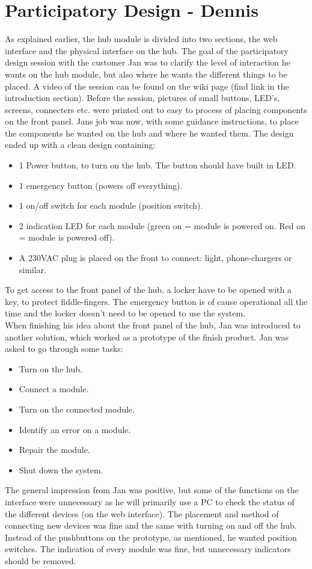 \section{Participatory Design - Dennis}
As explained earlier, the hub module is divided into two sections, the web interface and the physical interface on the hub. 
The goal of the participatory design session with the customer Jan was to clarify the level of interaction he wants on the hub module, but also where he wants the different things to be placed. A video of the session can be found on the wiki page (find link in the introduction section). Before the session, pictures of small buttons, LED's, screens, connecters etc. were printed out to easy to process of placing components on the front panel. Jans job was now, with some guidance instructions, to place the components he wanted on the hub and where he wanted them. The design ended up with a clean design containing: 
\begin{itemize}
	\item 1 Power button, to turn on the hub. The button should have built in LED.
	\item 1 emergency button (powers off everything).
	\item 1 on/off switch for each module (position switch).
	\item 2 indication LED for each module (green on = module is powered on. Red on = module is powered off).
	\item A 230VAC plug is placed on the front to connect: light, phone-chargers or similar. 
\end{itemize}
To get access to the front panel of the hub, a locker have to be opened with a key, to protect fiddle-fingers. The emergency button is of cause operational all the time and the locker doesn't need to be opened to use the system.
\\When finishing his idea about the front panel of the hub, Jan was introduced to another solution, which worked as a prototype of the finish product. Jan was asked to go through some tasks:
\begin{itemize}
	\item Turn on the hub.
	\item Connect a module.
	\item Turn on the connected module.
	\item Identify an error on a module.
	\item Repair the module.
	\item Shut down the system.
\end{itemize}
The general impression from Jan was positive, but some of the functions on the interface were unnecessary as he will primarily use a PC to check the status of the different devices (on the web interface). The placement and method of connecting new devices was fine and the same with turning on and off the hub. Instead of the pushbuttons on the prototype, as mentioned, he wanted position switches. The indication of every module was fine, but unnecessary indicators should be removed. 
